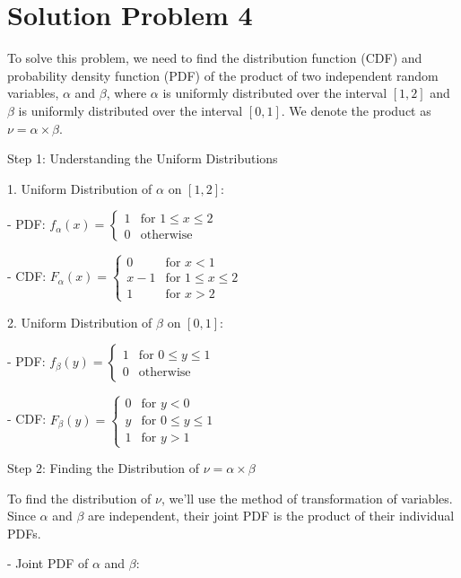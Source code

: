 \section*{Solution Problem 4}

To solve this problem, we need to find the distribution function (CDF) and probability density function (PDF) of the product of two independent random variables, \(\alpha\) and \(\beta\), where \(\alpha\) is uniformly distributed over the interval \([1, 2]\) and \(\beta\) is uniformly distributed over the interval \([0, 1]\). We denote the product as \(\nu = \alpha \times \beta\).

Step 1: Understanding the Uniform Distributions

1. Uniform Distribution of \(\alpha\) on \([1, 2]\):

- PDF: \( f_{\alpha}(x) = \begin{cases}
    1 & \text{for } 1 \leq x \leq 2 \\
    0 & \text{otherwise}
\end{cases} \)

- CDF: \( F_{\alpha}(x) = \begin{cases}
    0   & \text{for } x < 1           \\
    x-1 & \text{for } 1 \leq x \leq 2 \\
    1   & \text{for } x > 2
\end{cases} \)

2. Uniform Distribution of \(\beta\) on \([0, 1]\):

- PDF: \( f_{\beta}(y) = \begin{cases}
    1 & \text{for } 0 \leq y \leq 1 \\
    0 & \text{otherwise}
\end{cases} \)

- CDF: \( F_{\beta}(y) = \begin{cases}
    0 & \text{for } y < 0           \\
    y & \text{for } 0 \leq y \leq 1 \\
    1 & \text{for } y > 1
\end{cases} \)

Step 2: Finding the Distribution of \(\nu = \alpha \times \beta\)

To find the distribution of \(\nu\), we'll use the method of transformation of variables. Since \(\alpha\) and \(\beta\) are independent, their joint PDF is the product of their individual PDFs.

- Joint PDF of \(\alpha\) and \(\beta\):

